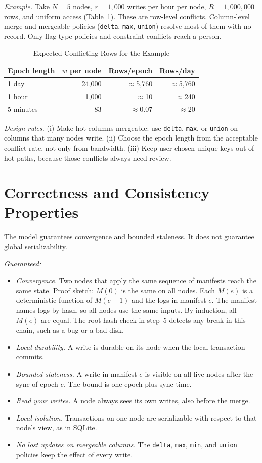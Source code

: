 \documentclass[journal]{IEEEtran}
\newcommand{\code}[1]{\texttt{#1}}
\begin{document}
\emph{Example.} Take $N=5$ nodes, $r=1{,}000$ writes per hour per node, $R=1{,}000{,}000$ rows, and uniform access (Table~\ref{tab:rate}). These are row-level conflicts. Column-level merge and mergeable policies (\code{delta}, \code{max}, \code{union}) resolve most of them with no record. Only flag-type policies and constraint conflicts reach a person.

\begin{table}[t]
\caption{Expected Conflicting Rows for the Example}\label{tab:rate}
\centering\small
\begin{tabular}{@{}lrrr@{}}
\toprule
Epoch length & $w$ per node & Rows/epoch & Rows/day\\
\midrule
1 day & 24{,}000 & $\approx$5{,}760 & $\approx$5{,}760\\
1 hour & 1{,}000 & $\approx$10 & $\approx$240\\
5 minutes & 83 & $\approx$0.07 & $\approx$20\\
\bottomrule
\end{tabular}
\end{table}

\emph{Design rules.} (i) Make hot columns mergeable: use \code{delta}, \code{max}, or \code{union} on columns that many nodes write. (ii) Choose the epoch length from the acceptable conflict rate, not only from bandwidth. (iii) Keep user-chosen unique keys out of hot paths, because those conflicts always need review.

\section{Correctness and Consistency Properties}
The model guarantees convergence and bounded staleness. It does not guarantee global serializability.

\emph{Guaranteed:}
\begin{itemize}
\item \emph{Convergence.} Two nodes that apply the same sequence of manifests reach the same state. Proof sketch: $M(0)$ is the same on all nodes. Each $M(e)$ is a deterministic function of $M(e{-}1)$ and the logs in manifest $e$. The manifest names logs by hash, so all nodes use the same inputs. By induction, all $M(e)$ are equal. The root hash check in step~5 detects any break in this chain, such as a bug or a bad disk.
\item \emph{Local durability.} A write is durable on its node when the local transaction commits.
\item \emph{Bounded staleness.} A write in manifest $e$ is visible on all live nodes after the sync of epoch $e$. The bound is one epoch plus sync time.
\item \emph{Read your writes.} A node always sees its own writes, also before the merge.
\item \emph{Local isolation.} Transactions on one node are serializable with respect to that node's view, as in SQLite.
\item \emph{No lost updates on mergeable columns.} The \code{delta}, \code{max}, \code{min}, and \code{union} policies keep the effect of every write.
\end{itemize}
\end{document}
